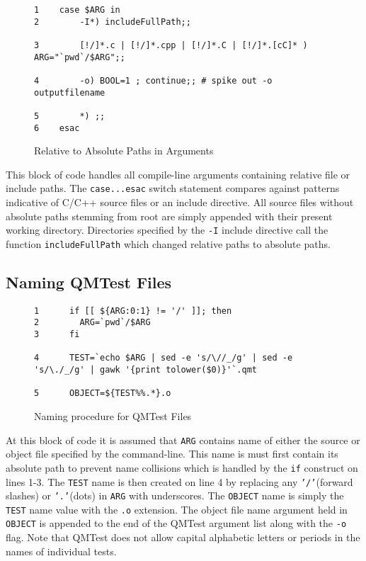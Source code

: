 \begin{figure}[!ht]
{\scriptsize
\begin{verbatim}
1    case $ARG in
2        -I*) includeFullPath;;
                                                                                
3        [!/]*.c | [!/]*.cpp | [!/]*.C | [!/]*.[cC]* ) ARG="`pwd`/$ARG";;
                                                                                
4        -o) BOOL=1 ; continue;; # spike out -o outputfilename
                                                                                
5        *) ;;
6    esac
\end{verbatim}
}
\caption{Relative to Absolute Paths in Arguments}
\end{figure}

This block of code handles all compile-line arguments containing relative file
or include paths. The {\tt case...esac} switch statement compares against
patterns indicative of C/C++ source files or an include directive. All source
files without absolute paths stemming from root are simply appended with their
present working directory. Directories specified by the {\tt -I} include 
directive call the function {\tt includeFullPath} which changed relative paths
to absolute paths.

\subsection{Naming QMTest Files}

\begin{figure}[!ht]
{\scriptsize
\begin{verbatim}
1      if [[ ${ARG:0:1} != '/' ]]; then
2        ARG=`pwd`/$ARG
3      fi
                                                                                
4      TEST=`echo $ARG | sed -e 's/\//_/g' | sed -e 's/\./_/g' | gawk '{print tolower($0)}'`.qmt
                                                                                
5      OBJECT=${TEST%%.*}.o
\end{verbatim}
}
\caption{Naming procedure for QMTest Files}
\end{figure}

At this block of code it is assumed that {\tt ARG} contains name of either the 
source or object file specified by the command-line. This name is must first
contain its absolute path to prevent name collisions which is handled by the
{\tt if} construct on lines 1-3. The {\tt TEST} name is then created on line 4
by replacing any {\tt '/'}(forward slashes) or {\tt '.'}(dots) in {\tt ARG} 
with underscores. The {\tt OBJECT} name is simply the {\tt TEST} name value
with the {\tt.o} extension. The object file name argument held in {\tt OBJECT}
is appended to the end of the QMTest argument list along with the {\tt -o} 
flag. Note that QMTest does not allow capital alphabetic letters or periods
in the names of individual tests.

